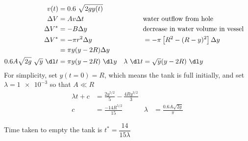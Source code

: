 \begin{enumerate}
          \begin{align}
              v(t)                             & = 0.6\ \sqrt{2gy(t)}                                                                           \\
              \Delta V                         & = Av \Delta t             &                 & \text{water outflow from hole}                   \\
              \Delta V^{*}                     & = -B \Delta y             &                 & \text{decrease in water volume in vessel}        \\
              \Delta V^{*}                     & = -\pi r^{2} \Delta y     &                 & = -\pi \left[R^{2} - (R - y)^{2}\right] \Delta y \\
                                               & = \pi y (y - 2R) \Delta y                                                                      \\
              0.6 A \sqrt{2g}\ \sqrt{y}\ \dl t & = \pi y (y - 2R) \ \dl y  & \lambda \ \dl t & = \sqrt{y} (y - 2R)\ \dl y
          \end{align}
          For simplicity, set $ y(t = 0) = R $, which means the tank is full initially,
          and set $ \lambda = \num{1e-3} $ so that $ A \ll R $
          \begin{align}
              \lambda t + c & = \frac{2y^{5/2}}{5} - \frac{4Ry^{3/2}}{3}                                           \\
              c             & = \frac{-14R^{5/2}}{15}                    & \lambda & = \frac{0.6 A \sqrt{2g}}{\pi}
          \end{align}

          \begin{figure}[H]
              \centering
          \end{figure}
          Time taken to empty the tank is $ t^{*} = \dfrac{14}{15 \lambda} $
\end{enumerate}